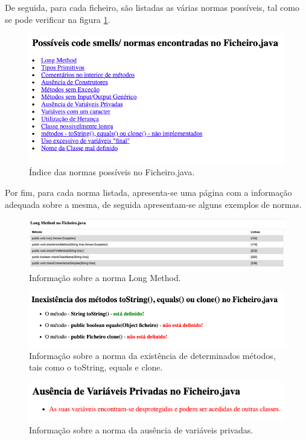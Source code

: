 De seguida, para cada ficheiro, são listadas as várias normas possíveis, tal como se pode verificar na figura \ref{img:indice-normas}.

\begin{figure}[H]
    \centering
    \includegraphics[scale=0.5]{images/indice-normas.png}
    \caption{Índice das normas possíveis no Ficheiro.java.}
    \label{img:indice-normas}
\end{figure}

Por fim, para cada norma listada, apresenta-se uma página com a informação adequada sobre a mesma, de seguida apresentam-se alguns exemplos de normas.

\begin{figure}[H]
    \centering
    \includegraphics[scale=0.30]{images/n1.png}
    \caption{Informação sobre a norma Long Method.}
    \label{img:n1}
\end{figure}

\begin{figure}[H]
    \centering
    \includegraphics[scale=0.5]{images/n2.png}
    \caption{Informação sobre a norma da existência de determinados métodos, tais como o toString, equals e clone.}
    \label{img:n1}
\end{figure}

\begin{figure}[H]
    \centering
    \includegraphics[scale=0.5]{images/n4.png}
    \caption{Informação sobre a norma da ausência de variáveis privadas.}
    \label{img:n1}
\end{figure}

